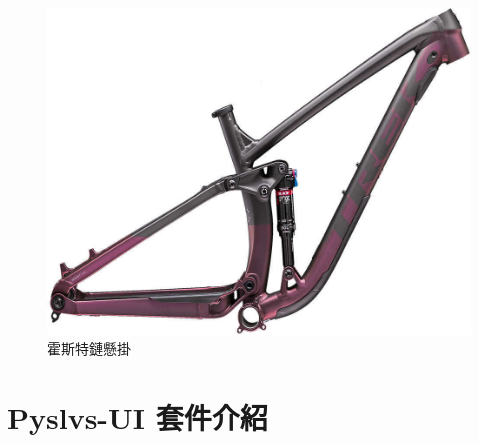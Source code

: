 \documentclass[14pt,a4paper]{report}  %
\begin{document}
{     \begin{figure}[hbt!]
        \centering
        \includegraphics[scale=0.2]{霍斯特鏈懸掛2.jpg} 
        \caption{霍斯特鏈懸掛} %
        \label{fig_Horst-link:scale} %
    \end{figure} 
    
      \chapter{Pyslvs-UI 套件介紹}
}
\end{document}
